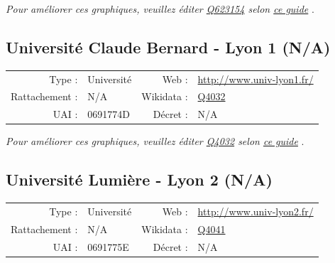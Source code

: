 \documentclass[11pt,french,landscape]{article}
\begin{document}
\textit{\scriptsize Pour améliorer ces graphiques, veuillez éditer \href{https://www.wikidata.org/entity/Q623154}{Q623154}  selon \href{https://github.com/cpesr/wikidataESR/blob/master/Rmd/wikidataESR.md}{ce guide}}
.


\newpage

\hypertarget{universituxe9-claude-bernard---lyon-1-na}{%
\subsection{Université Claude Bernard - Lyon 1
(N/A)}\label{universituxe9-claude-bernard---lyon-1-na}}

\begin{tabular*}{0.45\textwidth}{rp{2cm}rl}  
\hline  
Type : & Université & Web : &\href{http://www.univ-lyon1.fr/}{http://www.univ-lyon1.fr/} \\  
Rattachement : & N/A & Wikidata : & \href{https://www.wikidata.org/entity/Q4032}{Q4032} \\  
UAI : & 0691774D & Décret : & N/A \\  
\hline  
\end{tabular*}

\textit{\scriptsize Pour améliorer ces graphiques, veuillez éditer \href{https://www.wikidata.org/entity/Q4032}{Q4032}  selon \href{https://github.com/cpesr/wikidataESR/blob/master/Rmd/wikidataESR.md}{ce guide}}
.


\newpage

\hypertarget{universituxe9-lumiuxe8re---lyon-2-na}{%
\subsection{Université Lumière - Lyon 2
(N/A)}\label{universituxe9-lumiuxe8re---lyon-2-na}}

\begin{tabular*}{0.45\textwidth}{rp{2cm}rl}  
\hline  
Type : & Université & Web : &\href{http://www.univ-lyon2.fr/}{http://www.univ-lyon2.fr/} \\  
Rattachement : & N/A & Wikidata : & \href{https://www.wikidata.org/entity/Q4041}{Q4041} \\  
UAI : & 0691775E & Décret : & N/A \\  
\hline  
\end{tabular*}
\end{document}
